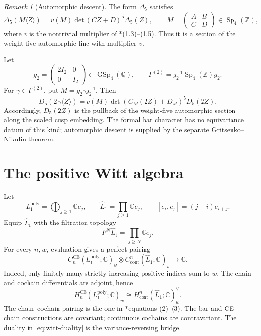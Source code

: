 \documentclass[11pt,reqno]{amsart}
\theoremstyle{definition}
\theoremstyle{remark}
\newtheorem{remark}[theorem]{Remark}
\providecommand{\CE}{\mathrm{CE}}
\begin{document}
\begin{remark}[Automorphic descent]
\label{rem:automorphic-descent}
The form \(\Delta_5\) satisfies
\[
 \Delta_5(M\langle Z\rangle)
 =v(M)\det(CZ+D)^5\Delta_5(Z),
 \qquad
 M=\begin{pmatrix}A&B\\C&D\end{pmatrix}
 \in\operatorname{Sp}_4(\mathbb Z),
\]
where \(v\) is the nontrivial multiplier of
\cite{GN97}*{(1.3)--(1.5)}.  Thus it is a section of the weight-five
automorphic line with multiplier \(v\).

Let
\[
 g_2=\begin{pmatrix}2I_2&0\\0&I_2\end{pmatrix}
 \in\operatorname{GSp}_4(\mathbb Q),\qquad
 \Gamma^{(2)}=g_2^{-1}\operatorname{Sp}_4(\mathbb Z)g_2.
\]
For \(\gamma\in\Gamma^{(2)}\), put
\(M=g_2\gamma g_2^{-1}\).  Then
\[
 D_5\!\left(2\,\gamma\langle Z\rangle\right)
 =
 v(M)\det\!\left(C_M(2Z)+D_M\right)^5D_5(2Z).
\]
Accordingly, \(D_5(2Z)\) is the pullback of the weight-five automorphic
section along the scaled cusp embedding.  The formal bar character has
no equivariance datum of this kind; automorphic descent is supplied by
the separate Gritsenko--Nikulin theorem.
\end{remark}

\section{The positive Witt algebra}

Let
\[
 L_1^{\mathrm{poly}}=\bigoplus_{j\ge1}\mathbb Ce_j,
 \qquad
 \widehat L_1=\prod_{j\ge1}\mathbb Ce_j,
 \qquad [e_i,e_j]=(j-i)e_{i+j}.
\]
Equip \(\widehat L_1\) with the filtration topology
\[
 F^N\widehat L_1=\prod_{j\ge N}\mathbb Ce_j.
\]
For every \(n,w\), evaluation gives a perfect pairing
\[
 C_n^{\CE}(L_1^{\mathrm{poly}};\mathbb C)_w
 \otimes
 C^n_{\mathrm{cont}}(\widehat L_1;\mathbb C)_w
 \longrightarrow\mathbb C.
\]
Indeed, only finitely many strictly increasing positive indices sum to
\(w\).  The chain and cochain differentials are adjoint, hence
\begin{equation}
 H_n^{\CE}(L_1^{\mathrm{poly}};\mathbb C)_w
 \cong
 H^n_{\mathrm{cont}}(\widehat L_1;\mathbb C)_w^\vee.
 \label{eq:witt-duality}
\end{equation}
The chain--cochain pairing is the one in
\cite{Gon73}*{equations (2)--(3)}.
The bar and CE chain constructions are covariant; continuous cochains
are contravariant.  The duality in \eqref{eq:witt-duality} is the
variance-reversing bridge.
\end{document}
